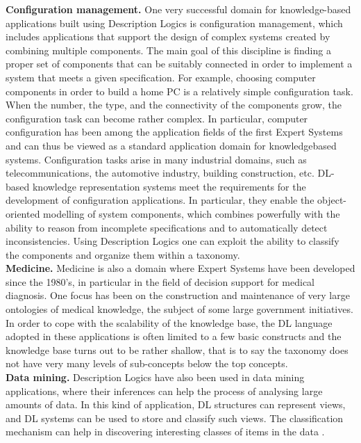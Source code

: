 \documentclass[a4paper, 11pt, oneside]{elsarticle}
\begin{document}
\textbf{Configuration management.} One very successful domain for knowledge-based applications built using Description Logics is configuration management, which includes applications that support the design of complex systems created by combining multiple components.
The main goal of this discipline is finding a proper set of components that can be suitably connected in order to implement a system that meets a given specification.
For example, choosing computer components in order to build a home PC is a relatively simple configuration task.
When the number, the type, and the connectivity of the components grow, the configuration task can become rather complex.
In particular, computer configuration has been among the application fields of the first Expert Systems and can thus be viewed as a standard application domain for knowledgebased systems.
Configuration tasks arise in many industrial domains, such as telecommunications, the automotive industry, building construction, etc.
DL-based knowledge representation systems meet the requirements for the development of configuration applications.
In particular, they enable the object-oriented modelling of system components, which combines powerfully with the ability to reason from incomplete specifications and to automatically detect inconsistencies.
Using Description Logics one can exploit the ability to classify the components and organize them within a taxonomy.\\

\textbf{Medicine.} Medicine is also a domain where Expert Systems have been developed since the 1980’s, in particular in the field of decision support for medical diagnosis. One focus has been on the construction and maintenance of very large ontologies of medical knowledge, the subject of some large government initiatives.
In order to cope with the scalability of the knowledge base, the DL language adopted in these applications is often limited to a few basic constructs and the knowledge base turns out to be rather shallow, that is to say the taxonomy does not have very many levels of sub-concepts below the top concepts.\\

\textbf{Data mining.} Description Logics have also been used in data mining applications, where their inferences can help the process of analysing large amounts of data.
In this kind of application, DL structures can represent views, and DL systems can be used to store and classify such views. The classification mechanism can help in discovering interesting classes of items in the data
\cite{Nardi:2003:IDL:885746.885748}.
\end{document}

